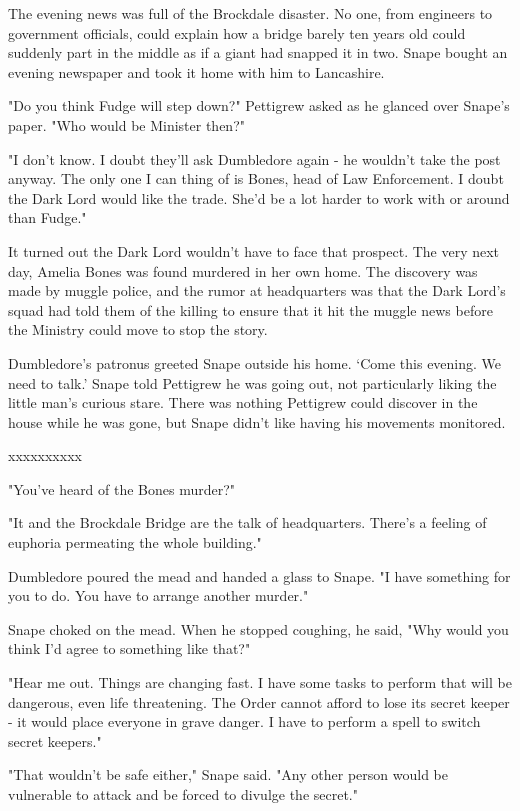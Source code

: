 \documentclass[a4paper,11pt]{article}
\begin{document}
The evening news was full of the Brockdale disaster. No one, from engineers to government officials, could explain how a bridge barely ten years old could suddenly part in the middle as if a giant had snapped it in two. Snape bought an evening newspaper and took it home with him to Lancashire.

"Do you think Fudge will step down?" Pettigrew asked as he glanced over Snape's paper. "Who would be Minister then?"

"I don't know. I doubt they'll ask Dumbledore again - he wouldn't take the post anyway. The only one I can thing of is Bones, head of Law Enforcement. I doubt the Dark Lord would like the trade. She'd be a lot harder to work with or around than Fudge."

It turned out the Dark Lord wouldn't have to face that prospect. The very next day, Amelia Bones was found murdered in her own home. The discovery was made by muggle police, and the rumor at headquarters was that the Dark Lord's squad had told them of the killing to ensure that it hit the muggle news before the Ministry could move to stop the story.

Dumbledore's patronus greeted Snape outside his home. `Come this evening. We need to talk.' Snape told Pettigrew he was going out, not particularly liking the little man's curious stare. There was nothing Pettigrew could discover in the house while he was gone, but Snape didn't like having his movements monitored.

xxxxxxxxxx

"You've heard of the Bones murder?"

"It and the Brockdale Bridge are the talk of headquarters. There's a feeling of euphoria permeating the whole building."

Dumbledore poured the mead and handed a glass to Snape. "I have something for you to do. You have to arrange another murder."

Snape choked on the mead. When he stopped coughing, he said, "Why would you think I'd agree to something like that?"

"Hear me out. Things are changing fast. I have some tasks to perform that will be dangerous, even life threatening. The Order cannot afford to lose its secret keeper - it would place everyone in grave danger. I have to perform a spell to switch secret keepers."

"That wouldn't be safe either," Snape said. "Any other person would be vulnerable to attack and be forced to divulge the secret."
\end{document}
